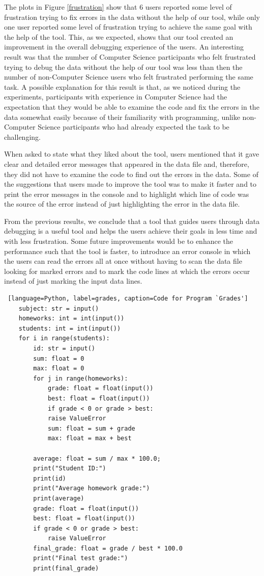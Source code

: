 \documentclass[10pt]{report}
\begin{document}
The plots in Figure \ref{frustration} show that 6 users reported some level of frustration trying to fix errors in the data without the help of our tool, while only one user reported some level of frustration trying to achieve the same goal with the help of the tool. This, as we expected, shows that our tool created an improvement in the overall debugging experience of the users. An interesting result was that the number of Computer Science participants who felt frustrated trying to debug the data without the help of our tool was less than then the number of non-Computer Science users who felt frustrated performing the same task. A possible explanation for this result is that, as we noticed during the experiments, participants with experience in Computer Science had the expectation that they would be able to examine the code and fix the errors in the data somewhat easily because of their familiarity with programming, unlike non-Computer Science participants who had already expected the task to be challenging.

When asked to state what they liked about the tool, users mentioned that it gave clear and detailed error messages that appeared in the data file and, therefore, they did not have to examine the code to find out the errors in the data. Some of the suggestions that users made to improve the tool was to make it faster and to print the error messages in the console and to highlight which line of code was the source of the error instead of just highlighting the error in the data file. 

From the previous results, we conclude that a tool that guides users through data debugging is a useful tool and helps the users achieve their goals in less time and with less frustration. Some future improvements would be to enhance the performance such that the tool is faster, to introduce an error console in which the users can read the errors all at once without having to scan the data file looking for marked errors and to mark the code lines at which the errors occur instead of just marking the input data lines.  

\begin{lstlisting} [language=Python, label=grades, caption=Code for Program `Grades']
	subject: str = input()
	homeworks: int = int(input())
	students: int = int(input())
	for i in range(students):
		id: str = input()
		sum: float = 0
		max: float = 0
		for j in range(homeworks):
			grade: float = float(input())
			best: float = float(input())
			if grade < 0 or grade > best:
			raise ValueError
			sum: float = sum + grade
			max: float = max + best
		
		average: float = sum / max * 100.0;
		print("Student ID:")
		print(id)
		print("Average homework grade:")
		print(average)
		grade: float = float(input())
		best: float = float(input())
		if grade < 0 or grade > best:
			raise ValueError
		final_grade: float = grade / best * 100.0
		print("Final test grade:")
		print(final_grade)
\end{lstlisting}
\end{document}
